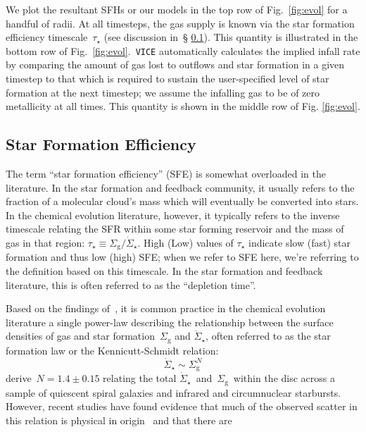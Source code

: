 \documentclass[fleqn, usenatbib]{mnras}
\begin{document}
We plot the resultant SFHs or our models in the top row of Fig.~\ref{fig:evol} 
for a handful of radii. At all timesteps, the gas supply is known via the star 
formation efficiency timescale~$\tau_\star$ (see discussion in~\S 
\ref{sec:methods:sfe}). This quantity is illustrated in the bottom row of 
Fig.~\ref{fig:evol}.~\texttt{VICE} automatically calculates the implied infall 
rate by comparing the amount of gas lost to outflows and star formation in a 
given timestep to that which is required to sustain the user-specified level of 
star formation at the next timestep; we assume the infalling gas to be of zero 
metallicity at all times. This quantity is shown in the middle row of Fig. 
\ref{fig:evol}. 

\subsection{Star Formation Efficiency} 
\label{sec:methods:sfe} 
The term ``star formation efficiency'' (SFE) is somewhat overloaded in the 
literature. In the star formation and feedback community, it usually 
refers to the fraction of a molecular cloud's mass which will eventually be 
converted into stars. In the chemical evolution literature, however, it 
typically refers to the inverse timescale relating the SFR within some star 
forming reservoir and the mass of gas in that region: 
$\tau_\star \equiv \Sigma_\text{g}/\dot{\Sigma}_\star$. High (Low) values of 
$\tau_\star$ indicate slow (fast) star formation and thus low (high) SFE; when 
we refer to SFE here, we're referring to the definition based on this 
timescale. In the star formation and feedback literature, this is often 
referred to as the ``depletion time''. 
\par 
Based on the findings of~\citet{Kennicutt1998}, it is common practice in the 
chemical evolution literature a single power-law describing the relationship 
between the surface densities of gas and star formation~$\Sigma_\text{g}$ and 
$\dot{\Sigma}_\star$, often referred to as the star formation law or the 
Kennicutt-Schmidt relation: 
\begin{equation} 
\dot{\Sigma}_\star \sim \Sigma_\text{g}^N 
\end{equation} 
\citet{Kennicutt1998} derive~$N = 1.4 \pm 0.15$ relating the total 
$\dot{\Sigma}_\star$~and~$\Sigma_\text{g}$~within the disc across a sample of 
quiescent spiral galaxies and infrared and circumnuclear starbursts. However, 
recent studies have found evidence that much of the observed scatter in this 
relation is physical in origin~\citep{delosReyes2019} and that there are 
\end{document}
